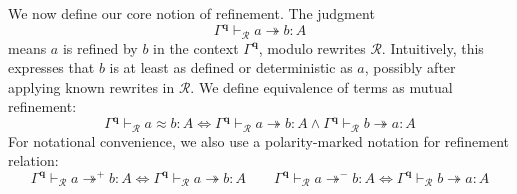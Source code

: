 \documentclass[acmsmall,screen,anonymous,review]{acmart}
\newcommand{\mc}[1]{\ensuremath{\mathcal{#1}}}
\newcommand{\mb}[1]{\ensuremath{\mathbf{#1}}}
\newcommand{\teqv}{\approx}
\newcommand{\tref}{\twoheadrightarrow}
\newcommand{\tmle}[5]{#1 \vdash_{#2} #3 \tref #4 : {#5}}
\newcommand{\tmlep}[6]{#1 \vdash_{#2} #3 \tref^{#6} #4 : {#5}}
\newcommand{\tmeq}[5]{#1 \vdash_{#2} #3 \teqv #4 : {#5}}
\begin{document}
We now define our core notion of refinement. The judgment
\begin{equation*}
  \tmle{\Gamma^{\mb{q}}}{\mc{R}}{a}{b}{A}
\end{equation*}
means  $a$ is refined by $b$ in the context $\Gamma^{\mb{q}}$, modulo rewrites
$\mc{R}$. Intuitively, this expresses that $b$ is at least as defined or deterministic as $a$,
possibly after applying known rewrites in $\mc{R}$. We define equivalence of terms as mutual
refinement:
\begin{equation}
  \tmeq{\Gamma^{\mb{q}}}{\mc{R}}{a}{b}{A}
  \iff \tmle{\Gamma^{\mb{q}}}{\mc{R}}{a}{b}{A} 
  \land \tmle{\Gamma^{\mb{q}}}{\mc{R}}{b}{a}{A}
\end{equation}
For notational convenience, we also use a polarity-marked notation
for refinement relation:
\begin{equation*}
  \tmlep{\Gamma^{\mb{q}}}{\mc{R}}{a}{b}{A}{+} \iff \tmle{\Gamma^{\mb{q}}}{\mc{R}}{a}{b}{A} \qquad
  \tmlep{\Gamma^{\mb{q}}}{\mc{R}}{a}{b}{A}{-} \iff \tmle{\Gamma^{\mb{q}}}{\mc{R}}{b}{a}{A}
\end{equation*}
\end{document}
